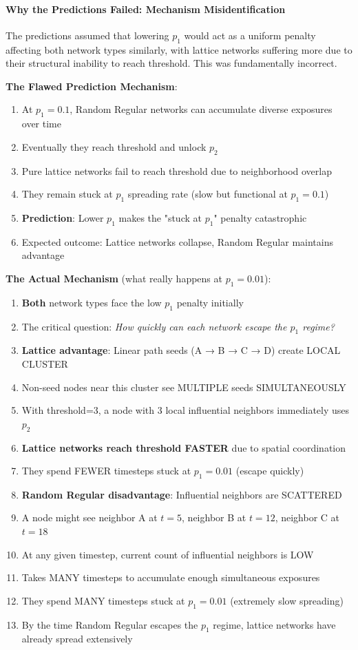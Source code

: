 \documentclass[12pt,a4paper]{article}
\begin{document}
\paragraph{Why the Predictions Failed: Mechanism Misidentification}

The predictions assumed that lowering $p_1$ would act as a uniform penalty affecting both network types similarly, with lattice networks suffering more due to their structural inability to reach threshold. This was fundamentally incorrect.

\textbf{The Flawed Prediction Mechanism}:
\begin{enumerate}
    \item At $p_1=0.1$, Random Regular networks can accumulate diverse exposures over time
    \item Eventually they reach threshold and unlock $p_2$
    \item Pure lattice networks fail to reach threshold due to neighborhood overlap
    \item They remain stuck at $p_1$ spreading rate (slow but functional at $p_1=0.1$)
    \item \textbf{Prediction}: Lower $p_1$ makes the "stuck at $p_1$" penalty catastrophic
    \item Expected outcome: Lattice networks collapse, Random Regular maintains advantage
\end{enumerate}

\textbf{The Actual Mechanism} (what really happens at $p_1=0.01$):
\begin{enumerate}
    \item \textbf{Both} network types face the low $p_1$ penalty initially
    \item The critical question: \textit{How quickly can each network escape the $p_1$ regime?}
    \item \textbf{Lattice advantage}: Linear path seeds (A → B → C → D) create LOCAL CLUSTER
    \item Non-seed nodes near this cluster see MULTIPLE seeds SIMULTANEOUSLY
    \item With threshold=3, a node with 3 local influential neighbors immediately uses $p_2$
    \item \textbf{Lattice networks reach threshold FASTER} due to spatial coordination
    \item They spend FEWER timesteps stuck at $p_1=0.01$ (escape quickly)
    \item \textbf{Random Regular disadvantage}: Influential neighbors are SCATTERED
    \item A node might see neighbor A at $t=5$, neighbor B at $t=12$, neighbor C at $t=18$
    \item At any given timestep, current count of influential neighbors is LOW
    \item Takes MANY timesteps to accumulate enough simultaneous exposures
    \item They spend MANY timesteps stuck at $p_1=0.01$ (extremely slow spreading)
    \item By the time Random Regular escapes the $p_1$ regime, lattice networks have already spread extensively
\end{enumerate}
\end{document}

